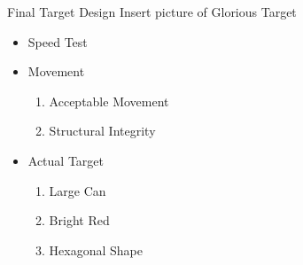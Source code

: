 \begin{frame}{Final Target Design}
Insert picture of Glorious Target 
\begin{itemize}
    \item Speed Test
    \item Movement
    	\begin{enumerate}
  			\item Acceptable Movement
  			\item Structural Integrity
		\end{enumerate}
	\item Actual Target
		\begin{enumerate}
  			\item Large Can
  			\item Bright Red
  			\item Hexagonal Shape
		\end{enumerate}
\end{itemize}
\end{frame}








